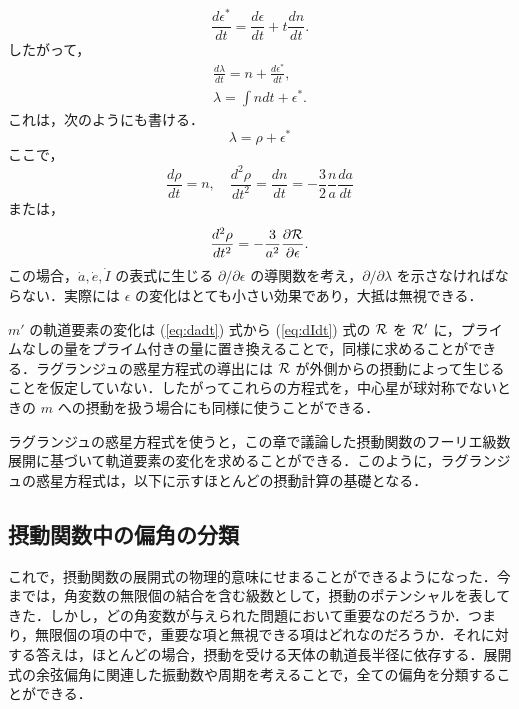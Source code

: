 \documentclass[11pt,a4paper,oneside,onecolumn]{jarticle}
\begin{document}
\begin{equation}
\frac{d \epsilon^{\ast}}{d t} = \frac{d \epsilon}{d t} + t \frac{d n}{d t}.
\end{equation}
したがって，
\begin{eqnarray}
\frac{d \lambda}{d t} = n + \frac{d \epsilon^{\ast}}{d t}, \\
\lambda = \int n d t + \epsilon^{\ast}.
\end{eqnarray}
これは，次のようにも書ける．
\begin{equation}
\lambda = \rho + \epsilon^{\ast}
\end{equation}
ここで，
\begin{equation}
\frac{d \rho}{d t} = n, \quad \frac{d^2 \rho}{d t^2} = \frac{d n}{d t} = - \frac{3}{2} \frac{n}{a} \frac{d a}{d t}
\end{equation}
または，
\begin{equation}
\frac{d^2 \rho}{d t^2} = - \frac{3}{a^2} \frac{\partial {\cal R}}{\partial \epsilon}.
\end{equation}
この場合，$\dot{a}, \dot{e}, \dot{I}$ の表式に生じる $\partial / \partial \epsilon$ の導関数を考え，$\partial / \partial \lambda$ を示さなければならない．実際には $\epsilon$ の変化はとても小さい効果であり，大抵は無視できる．

$m'$ の軌道要素の変化は (\ref{eq:dadt}) 式から (\ref{eq:dIdt}) 式の ${\cal R}$ を ${\cal R'}$ に，プライムなしの量をプライム付きの量に置き換えることで，同様に求めることができる．ラグランジュの惑星方程式の導出には ${\cal R}$ が外側からの摂動によって生じることを仮定していない．したがってこれらの方程式を，中心星が球対称でないときの $m$ への摂動を扱う場合にも同様に使うことができる．

ラグランジュの惑星方程式を使うと，この章で議論した摂動関数のフーリエ級数展開に基づいて軌道要素の変化を求めることができる．このように，ラグランジュの惑星方程式は，以下に示すほとんどの摂動計算の基礎となる．

\subsection{摂動関数中の偏角の分類}
これで，摂動関数の展開式の物理的意味にせまることができるようになった．今までは，角変数の無限個の結合を含む級数として，摂動のポテンシャルを表してきた．しかし，どの角変数が与えられた問題において重要なのだろうか．つまり，無限個の項の中で，重要な項と無視できる項はどれなのだろうか．それに対する答えは，ほとんどの場合，摂動を受ける天体の軌道長半径に依存する．展開式の余弦偏角に関連した振動数や周期を考えることで，全ての偏角を分類することができる．
\end{document}
